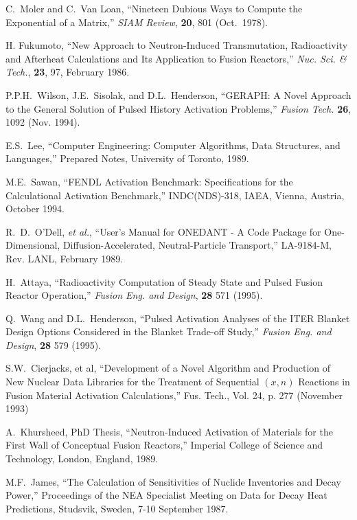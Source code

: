 \begin{thebibliography}{100}
 C.~Moler and C.~Van Loan, ``Nineteen Dubious Ways to
  Compute the Exponential of a Matrix,'' \textsl{SIAM
    Review}, \textbf{20}, 801 (Oct.~1978).
  
 H. Fukumoto, ``New Approach to
  Neutron-Induced Transmutation, Radioactivity and Afterheat
  Calculations and Its Application to Fusion Reactors,'' \textsl{Nuc. Sci.
  \& Tech.}, \textbf{23}, 97, February 1986.
  
 P.P.H.~Wilson, J.E.~Sisolak, and D.L.~Henderson,
  ``GERAPH: A Novel Approach to the General Solution of Pulsed History
  Activation Problems,'' \textsl{Fusion Tech.} \textbf{26}, 1092 (Nov.
  1994).
  
 E.S.~Lee, ``Computer Engineering: Computer
  Algorithms, Data Structures, and Languages,'' Prepared Notes,
  University of Toronto, 1989.

M.E.~Sawan, ``FENDL Activation
  Benchmark: Specifications for the Calculational Activation
  Benchmark,'' INDC(NDS)-318, IAEA, Vienna, Austria, October 1994.

R.~D.~O'Dell, \textsl{et al.}, ``User's Manual
  for ONEDANT - A Code Package for One-Dimensional,
  Diffusion-Accelerated, Neutral-Particle Transport,'' LA-9184-M, Rev.
  LANL, February 1989.
  
 H.~Attaya, ``Radioactivity Computation of Steady
  State and Pulsed Fusion Reactor Operation,'' \textsl{Fusion Eng. and
  Design}, \textbf{28} 571 (1995).

 Q.~Wang and D.L.~Henderson, ``Pulsed Activation
  Analyses of the ITER Blanket Design Options Considered in the
  Blanket Trade-off Study,'' \textsl{Fusion Eng. and Design},
  \textbf{28} 579 (1995).

 S.W.~Cierjacks, et al, ``Development of a
  Novel Algorithm and Production of New Nuclear Data Libraries for the
  Treatment of Sequential $(x,n)$ Reactions in Fusion Material
  Activation Calculations,'' Fus. Tech., Vol. 24, p. 277 (November
  1993)
    
 A.~Khursheed, PhD Thesis, ``Neutron-Induced
  Activation of Materials for the First Wall of Conceptual Fusion
  Reactors,'' Imperial College of Science and Technology, London,
  England, 1989.
    
 M.F.~James, ``The Calculation of Sensitivities
  of Nuclide Inventories and Decay Power,'' Proceedings of the NEA
  Specialist Meeting on Data for Decay Heat Predictions, Studsvik,
  Sweden, 7-10 September 1987.
    

\end{thebibliography}
